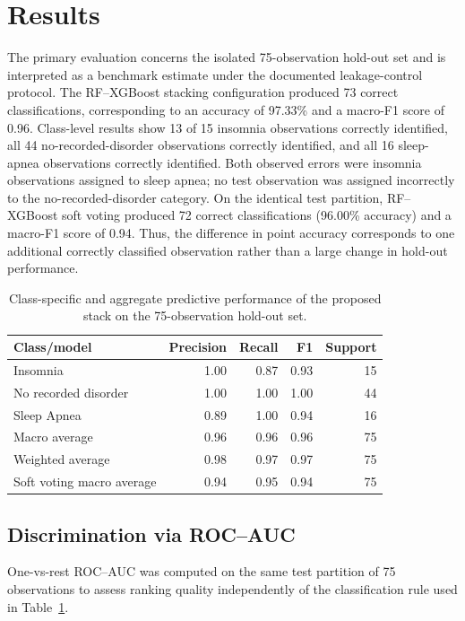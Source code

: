 \documentclass[a4paper,fleqn]{cas-dc}
\begin{document}
\section{Results}
\label{sec:results}
The primary evaluation concerns the isolated 75-observation hold-out set and is interpreted as a benchmark estimate under the documented leakage-control protocol. The RF--XGBoost stacking configuration produced 73 correct classifications, corresponding to an accuracy of 97.33\% and a macro-F1 score of 0.96. Class-level results show 13 of 15 insomnia observations correctly identified, all 44 no-recorded-disorder observations correctly identified, and all 16 sleep-apnea observations correctly identified. Both observed errors were insomnia observations assigned to sleep apnea; no test observation was assigned incorrectly to the no-recorded-disorder category. On the identical test partition, RF--XGBoost soft voting produced 72 correct classifications (96.00\% accuracy) and a macro-F1 score of 0.94. Thus, the difference in point accuracy corresponds to one additional correctly classified observation rather than a large change in hold-out performance.

\begin{table}[width=\textwidth,pos=!tbp]
\centering
\caption{Class-specific and aggregate predictive performance of the proposed stack on the 75-observation hold-out set.}
\label{tab:metrics}
\small
\begin{tabular}{lrrrr}
\toprule
Class/model & Precision & Recall & F1 & Support \\
\midrule
Insomnia & 1.00 & 0.87 & 0.93 & 15 \\
No recorded disorder & 1.00 & 1.00 & 1.00 & 44 \\
Sleep Apnea & 0.89 & 1.00 & 0.94 & 16 \\
Macro average & 0.96 & 0.96 & 0.96 & 75 \\
Weighted average & 0.98 & 0.97 & 0.97 & 75 \\
\midrule
Soft voting macro average & 0.94 & 0.95 & 0.94 & 75 \\
\bottomrule
\end{tabular}
\end{table}

\subsection{Discrimination via ROC--AUC}
\label{sec:rocauc}

One-vs-rest ROC--AUC was computed on the same test partition of 75 observations to assess ranking quality independently of the classification rule used in Table~\ref{tab:metrics}. 
\end{document}
